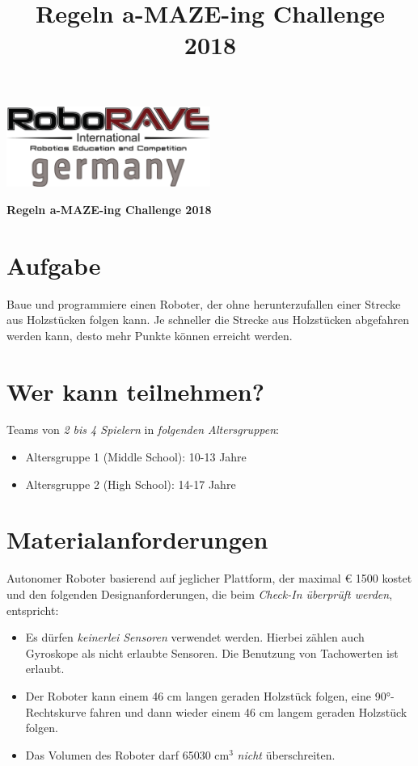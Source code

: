 \documentclass[a4paper,12pt]{article}
\begin{document}
\title{Regeln a-MAZE-ing Challenge 2018}

 \begin{center}
\includegraphics[width=0.5\textwidth]{logo.png}

\huge                      %
\bfseries                   %
Regeln a-MAZE-ing Challenge 2018
  \end{center}
\section{Aufgabe}
Baue und programmiere einen Roboter, der ohne herunterzufallen einer Strecke aus Holzstücken folgen
kann. Je schneller die Strecke aus Holzstücken abgefahren werden kann, desto mehr Punkte können erreicht
werden.
\section{Wer kann teilnehmen?}
Teams von \emph{2 bis 4 Spielern} in \emph{folgenden Altersgruppen}:
\begin{itemize}
	\item Altersgruppe 1 (Middle School): 10-13 Jahre
	\item Altersgruppe 2 (High School): 14-17 Jahre
\end{itemize}
\section{Materialanforderungen}
Autonomer Roboter basierend auf jeglicher Plattform, der maximal  \euro{ 1500} kostet und den folgenden
Designanforderungen, die beim \emph{Check-In überprüft werden}, entspricht:
\begin{itemize}
\item Es dürfen \emph{keinerlei Sensoren} verwendet werden. Hierbei zählen auch Gyroskope als nicht erlaubte Sensoren. Die Benutzung von Tachowerten ist erlaubt.
\item Der Roboter kann einem 46 cm langen geraden Holzstück folgen, eine 90°-Rechtskurve fahren und dann wieder
einem 46 cm langem geraden Holzstück folgen.
\item Das Volumen des Roboter darf 65030 cm$^{3}$ \emph{nicht} überschreiten.
\end{itemize}
\end{document}
